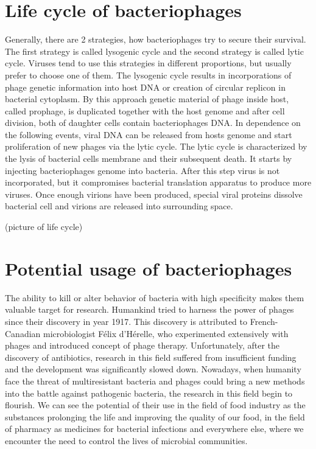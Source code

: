 \section{Life cycle of bacteriophages}
Generally, there are 2 strategies, how bacteriophages try to secure their survival.
The first strategy is called lysogenic cycle and the second strategy is called lytic cycle.
Viruses tend to use this strategies in different proportions, but usually prefer to choose one of them.
The lysogenic cycle results in incorporations of phage genetic information into host DNA or creation of circular replicon in bacterial cytoplasm.
By this approach genetic material of phage inside host, called prophage, is duplicated together with the host genome and after cell division, both of daughter cells contain bacteriophages DNA.
In dependence on the following events, viral DNA can be released from hosts genome and start proliferation of new phages via the lytic cycle.
The lytic cycle is characterized by the lysis of bacterial cells membrane and their subsequent death.
It starts by injecting bacteriophages genome into bacteria.
After this step virus is not incorporated, but it compromises bacterial translation apparatus to produce more viruses.
Once enough virions have been produced, special viral proteins dissolve bacterial cell and virions are released into surrounding space.

\medskip
(picture of life cycle)
\medskip

\section{Potential usage of bacteriophages}
The ability to kill or alter behavior of bacteria with high specificity makes them valuable target for research.
Humankind tried to harness the power of phages since their discovery in year 1917.
This discovery is attributed to French-Canadian microbiologist Félix d'Hérelle, who experimented extensively with phages and introduced concept of phage therapy.
Unfortunately, after the discovery of antibiotics, research in this field suffered from insufficient funding and the development was significantly slowed down.
Nowadays, when humanity face the threat of multiresistant bacteria and phages could bring a new methods into the battle against pathogenic bacteria, the research in this field begin to flourish.
We can see the potential of their use in the field of food industry as the substances prolonging the life and improving the quality of our food,
in the field of pharmacy as medicines for bacterial infections and everywhere else, where we encounter the need to control the lives of microbial communities.

